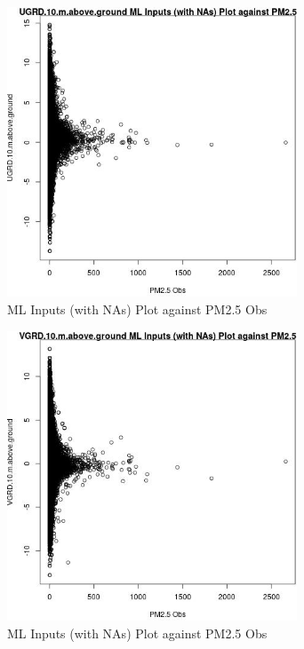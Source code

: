 \begin{figure} 
\centering  
\includegraphics[width=0.77\textwidth]{Code_Outputs/Report_ML_input_PM25_Step4_part_e_de_duplicated_aves_compiled_2019-05-20wNAs_UGRD10mabovegroundvPM25_Obs.jpg} 
\caption{\label{fig:Report_ML_input_PM25_Step4_part_e_de_duplicated_aves_compiled_2019-05-20wNAsUGRD10mabovegroundvPM25_Obs}ML Inputs (with NAs) Plot against PM2.5 Obs} 
\end{figure} 
 

\begin{figure} 
\centering  
\includegraphics[width=0.77\textwidth]{Code_Outputs/Report_ML_input_PM25_Step4_part_e_de_duplicated_aves_compiled_2019-05-20wNAs_VGRD10mabovegroundvPM25_Obs.jpg} 
\caption{\label{fig:Report_ML_input_PM25_Step4_part_e_de_duplicated_aves_compiled_2019-05-20wNAsVGRD10mabovegroundvPM25_Obs}ML Inputs (with NAs) Plot against PM2.5 Obs} 
\end{figure} 
 

